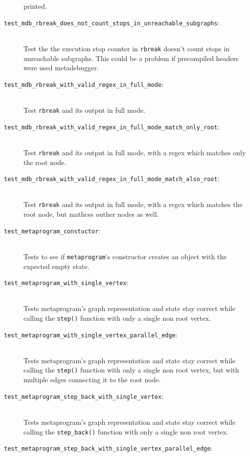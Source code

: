 \begin{description}
        printed.
    \item[\texttt{test\_mdb\_rbreak\_does\_not\_count\_stops\_in\_unreachable\_subgraphs}:] \hfill \\
        Test the the execution stop counter in \texttt{rbreak} doesn't count
        stops in unreachable subgraphs. This could be a problem if precompiled
        headers were used metadebugger.
    \item[\texttt{test\_mdb\_rbreak\_with\_valid\_regex\_in\_full\_mode}:] \hfill \\
        Test \texttt{rbreak} and its output in full mode.
    \item[\texttt{test\_mdb\_rbreak\_with\_valid\_regex\_in\_full\_mode\_match\_only\_root}:] \hfill \\
        Test \texttt{rbreak} and its output in full mode, with a regex which
        matches only the root node.
    \item[\texttt{test\_mdb\_rbreak\_with\_valid\_regex\_in\_full\_mode\_match\_also\_root}:] \hfill \\
        Test \texttt{rbreak} and its output in full mode, with a regex which
        matches the root node, but mathces outher nodes as well.
    \item[\texttt{test\_metaprogram\_constuctor}:] \hfill \\
        Tests to see if \texttt{metaprogram}'s constructor creates an object
        with the expected empty state.
    \item[\texttt{test\_metaprogram\_with\_single\_vertex}:] \hfill \\
        Tests metaprogram's graph representation and state stay correct while
        calling the \texttt{step()} function with only a single non root
        vertex.
    \item[\texttt{test\_metaprogram\_with\_single\_vertex\_parallel\_edge}:] \hfill \\
        Tests metaprogram's graph representation and state stay correct while
        calling the \texttt{step()} function with only a single non root
        vertex, but with multiple edges connecting it to the root node.
    \item[\texttt{test\_metaprogram\_step\_back\_with\_single\_vertex}:] \hfill \\
        Tests metaprogram's graph representation and state stay correct while
        calling the \texttt{step\_back()} function with only a single non root
        vertex.
    \item[\texttt{test\_metaprogram\_step\_back\_with\_single\_vertex\_parallel\_edge}:] \hfill \\

\end{description}
